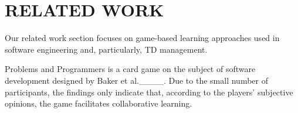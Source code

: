 \section{RELATED WORK}
\label{sec:RelatedWork}
        Our related work section focuses on game-based learning approaches used in software engineering and, particularly, TD management.
        

        Problems and Programmers is a card game on the subject of software development designed by Baker et al.____. 
        Due to the small number of participants, the findings only indicate that, according to the players' subjective opinions, the game facilitates collaborative learning.

